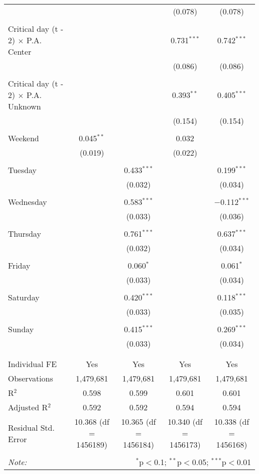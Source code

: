 \documentclass[
]{article}
\begin{document}
\begin{table}[!htbp]
{\begin{tabular}{@{\extracolsep{5pt}}lcccc}
  &  &  & (0.078) & (0.078) \\ 
  & & & & \\ 
 Critical day (t - 2) $\times$ P.A. Center &  &  & 0.731$^{***}$ & 0.742$^{***}$ \\ 
  &  &  & (0.086) & (0.086) \\ 
  & & & & \\ 
 Critical day (t - 2) $\times$ P.A. Unknown &  &  & 0.393$^{**}$ & 0.405$^{***}$ \\ 
  &  &  & (0.154) & (0.154) \\ 
  & & & & \\ 
 Weekend & 0.045$^{**}$ &  & 0.032 &  \\ 
  & (0.019) &  & (0.022) &  \\ 
  & & & & \\ 
 Tuesday &  & 0.433$^{***}$ &  & 0.199$^{***}$ \\ 
  &  & (0.032) &  & (0.034) \\ 
  & & & & \\ 
 Wednesday &  & 0.583$^{***}$ &  & $-$0.112$^{***}$ \\ 
  &  & (0.033) &  & (0.036) \\ 
  & & & & \\ 
 Thursday &  & 0.761$^{***}$ &  & 0.637$^{***}$ \\ 
  &  & (0.032) &  & (0.034) \\ 
  & & & & \\ 
 Friday &  & 0.060$^{*}$ &  & 0.061$^{*}$ \\ 
  &  & (0.033) &  & (0.034) \\ 
  & & & & \\ 
 Saturday &  & 0.420$^{***}$ &  & 0.118$^{***}$ \\ 
  &  & (0.033) &  & (0.035) \\ 
  & & & & \\ 
 Sunday &  & 0.415$^{***}$ &  & 0.269$^{***}$ \\ 
  &  & (0.033) &  & (0.034) \\ 
  & & & & \\ 
\hline \\[-1.8ex] 
Individual FE & Yes & Yes & Yes & Yes \\ 
Observations & 1,479,681 & 1,479,681 & 1,479,681 & 1,479,681 \\ 
R$^{2}$ & 0.598 & 0.599 & 0.601 & 0.601 \\ 
Adjusted R$^{2}$ & 0.592 & 0.592 & 0.594 & 0.594 \\ 
Residual Std. Error & 10.368 (df = 1456189) & 10.365 (df = 1456184) & 10.340 (df = 1456173) & 10.338 (df = 1456168) \\ 
\hline 
\hline \\[-1.8ex] 
\textit{Note:}  & \multicolumn{4}{r}{$^{*}$p$<$0.1; $^{**}$p$<$0.05; $^{***}$p$<$0.01} \\ 
\end{tabular}
} 
\end{table} 
\newpage
\end{document}
